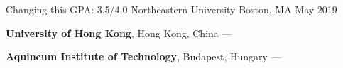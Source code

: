 
\begin{cventries}
  \cventry
    {Changing this GPA: 3.5/4.0} %
    {Northeastern University} %
    {Boston, MA} %
    {May 2019} %
    {
      \begin{cvitems} %
         \item {\textbf{University of Hong Kong}, Hong Kong, China --- }
         \vspace{0.5mm}
         \item {\textbf{Aquincum Institute of Technology}, Budapest, Hungary --- }
      \end{cvitems}
    }
\end{cventries}
